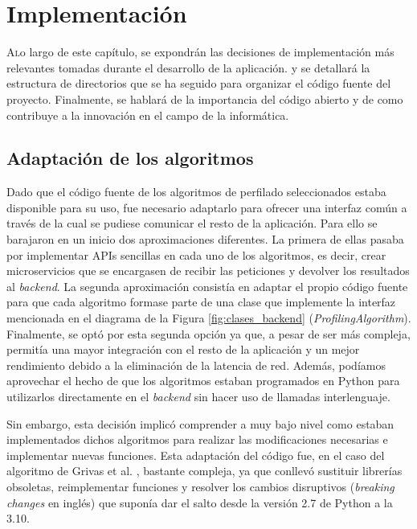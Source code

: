 \chapter{Implementación}
\label{chap:implementacion}

\lettrine{A} lo largo de este capítulo, se expondrán las decisiones de implementación más relevantes tomadas durante el desarrollo de la aplicación.
y se detallará la estructura de directorios que se ha seguido para organizar el código fuente del proyecto. Finalmente, se hablará
de la importancia del código abierto y de como contribuye a la innovación en el campo de la informática.

\section{Adaptación de los algoritmos}
\label{sec:adaptacion_algoritmos}

Dado que el código fuente de los algoritmos de perfilado seleccionados estaba disponible para su uso, fue necesario adaptarlo
para ofrecer una interfaz común a través de la cual se pudiese comunicar el resto de la aplicación.
Para ello se barajaron en un inicio dos aproximaciones diferentes. La primera de ellas pasaba
por implementar APIs sencillas en cada uno de los algoritmos, es decir, crear microservicios que se encargasen de recibir
las peticiones y devolver los resultados al \textit{backend}. La segunda aproximación consistía en adaptar el propio código
fuente para que cada algoritmo formase parte de una clase que implemente la interfaz mencionada en el diagrama de la Figura \ref{fig:clases_backend}
(\textit{ProfilingAlgorithm}). Finalmente, se optó por esta segunda opción ya que, a pesar de ser más compleja, permitía
una mayor integración con el resto de la aplicación y un mejor rendimiento debido a la eliminación de la latencia de red. Además,
podíamos aprovechar el hecho de que los algoritmos estaban programados en Python para utilizarlos directamente
en el \textit{backend} sin hacer uso de llamadas interlenguaje.

\bigskip
Sin embargo, esta decisión implicó comprender a muy bajo nivel como estaban implementados dichos algoritmos para realizar las modificaciones necesarias
e implementar nuevas funciones. Esta adaptación del código fue, en el caso del algoritmo de Grivas et al. \cite{grivas2015author},
bastante compleja, ya que conllevó sustituir librerías obsoletas, reimplementar funciones y resolver los cambios disruptivos (\textit{breaking changes} en inglés) que suponía
dar el salto desde la versión 2.7 de Python a la 3.10.

